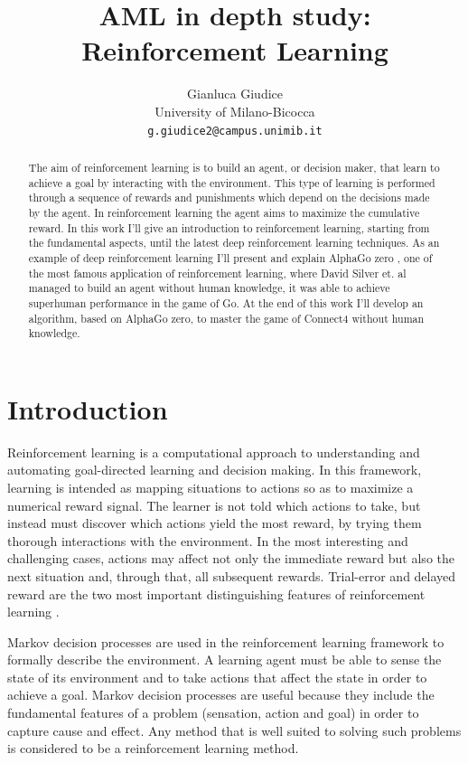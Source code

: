 \documentclass{article}
\title{AML in depth study: Reinforcement Learning}
\author{
 Gianluca Giudice\\
  University of Milano-Bicocca\\
  \texttt{g.giudice2@campus.unimib.it} \\
}
\begin{document}
\maketitle
\begin{abstract}
The aim of reinforcement learning is to build an agent, or decision maker, that learn to achieve a goal by interacting with the environment. This type of learning is performed through a sequence of rewards and punishments which depend on the decisions made by the agent. In reinforcement learning the agent aims to maximize the cumulative reward. In this work I'll give an introduction to reinforcement learning, starting from the fundamental aspects, until the latest deep reinforcement learning techniques. As an example of deep reinforcement learning I'll present and explain AlphaGo zero \cite{silver2017mastering}, one of the most famous application of reinforcement learning, where David Silver et. al managed to build an agent without human knowledge, it was able to achieve superhuman performance in the game of Go. At the end of this work I'll develop an algorithm, based on AlphaGo zero, to master the game of Connect4 without human knowledge.
\end{abstract}

\section{Introduction}

Reinforcement learning is a computational approach to understanding and automating goal-directed learning and decision making. In this framework, learning is intended as mapping situations to actions so as to maximize a numerical reward signal. The learner is not told which actions to take, but instead must discover which actions yield the most reward, by trying them thorough interactions with the environment. In the most interesting and challenging cases, actions may affect not only the immediate reward but also the next situation and, through that, all subsequent rewards. Trial-error and delayed reward  are the two most important distinguishing features of reinforcement learning \cite{10.5555/3312046}.

Markov decision processes are used in the reinforcement learning framework to formally describe the environment. A learning agent must be able to sense the state of its environment and to take actions that affect the state in order to achieve a goal. Markov decision processes are useful because  they include the  fundamental features of a problem (sensation, action and goal) in order to capture cause and effect. Any method that is well suited to solving such problems is considered to be a reinforcement learning method.
\end{document}
